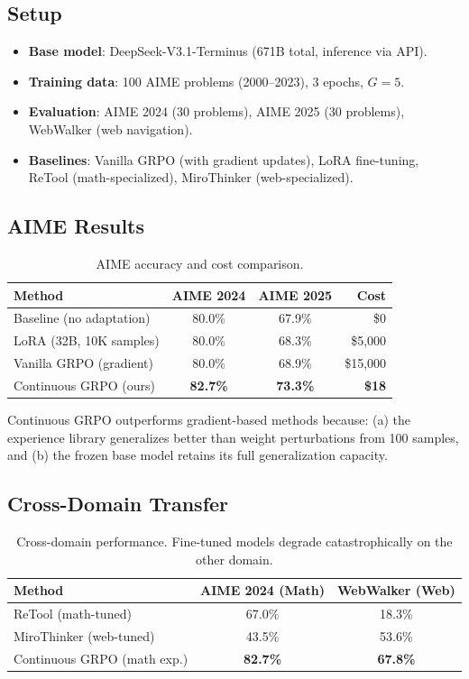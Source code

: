 \documentclass[11pt,letterpaper]{article}
\begin{document}
\subsection{Setup}

\begin{itemize}
    \item \textbf{Base model}: DeepSeek-V3.1-Terminus (671B total, inference via API).
    \item \textbf{Training data}: 100 AIME problems (2000--2023), 3 epochs, $G = 5$.
    \item \textbf{Evaluation}: AIME 2024 (30 problems), AIME 2025 (30 problems), WebWalker (web navigation).
    \item \textbf{Baselines}: Vanilla GRPO (with gradient updates), LoRA fine-tuning, ReTool (math-specialized), MiroThinker (web-specialized).
\end{itemize}

\subsection{AIME Results}

\begin{table}[t]
\centering
\begin{tabular}{lccr}
\toprule
\textbf{Method} & \textbf{AIME 2024} & \textbf{AIME 2025} & \textbf{Cost} \\
\midrule
Baseline (no adaptation) & 80.0\% & 67.9\% & \$0 \\
LoRA (32B, 10K samples) & 80.0\% & 68.3\% & \$5{,}000 \\
Vanilla GRPO (gradient) & 80.0\% & 68.9\% & \$15{,}000 \\
Continuous GRPO (ours) & \textbf{82.7\%} & \textbf{73.3\%} & \textbf{\$18} \\
\bottomrule
\end{tabular}
\caption{AIME accuracy and cost comparison.}
\label{tab:aime}
\end{table}

Continuous GRPO outperforms gradient-based methods because: (a) the experience library generalizes better than weight perturbations from 100 samples, and (b) the frozen base model retains its full generalization capacity.

\subsection{Cross-Domain Transfer}

\begin{table}[t]
\centering
\begin{tabular}{lcc}
\toprule
\textbf{Method} & \textbf{AIME 2024 (Math)} & \textbf{WebWalker (Web)} \\
\midrule
ReTool (math-tuned) & 67.0\% & 18.3\% \\
MiroThinker (web-tuned) & 43.5\% & 53.6\% \\
Continuous GRPO (math exp.) & \textbf{82.7\%} & \textbf{67.8\%} \\
\bottomrule
\end{tabular}
\caption{Cross-domain performance.  Fine-tuned models degrade catastrophically on the other domain.}
\label{tab:cross-domain}
\end{table}
\end{document}
